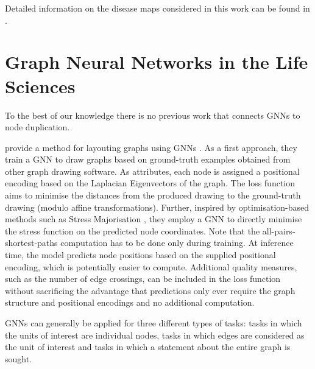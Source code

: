 \documentclass[
	fontsize=10pt, %
	twoside=false, %
	secnumdepth=1, %
  toc=indentunnumbered %
]{kaobook}
\begin{document}
Detailed information on the disease maps considered in this work can be found in
.



\section{Graph Neural Networks in the Life Sciences}
\label{sec:gnn-applications}




To the best of our knowledge there is no previous work that connects GNNs to
node duplication.

\citeauthor{tiezzi_GraphNeuralNetworks_2021} provide a method for layouting
graphs using GNNs
\cite{tiezzi_GraphNeuralNetworks_2021}
. As a first approach, they train a GNN to draw graphs based on
ground-truth examples obtained from other graph drawing software. As attributes,
each node is assigned a positional encoding based on the Laplacian Eigenvectors
of the graph. The loss function aims to minimise the distances from the produced
drawing to the ground-truth drawing (modulo affine transformations).
Further, inspired by optimisation-based methods such as Stress Majorisation
\cite{gansner_GraphDrawingStress_2005}, they employ a GNN to directly minimise
the stress function on the predicted node coordinates. Note that the
all-pairs-shortest-paths computation has to be done only during training. At
inference time, the model predicts node positions based on the supplied
positional encoding, which is potentially easier to compute. Additional quality
measures, such as the number of edge crossings, can be included in the loss
function without sacrificing the advantage that predictions only ever require
the graph structure and positional encodings and no additional computation.


GNNs can generally be applied for three different types of tasks:
 tasks in which the units of interest are individual nodes,
 tasks in which edges are considered as the unit of interest and
 tasks in which a statement about the entire graph is sought.
\end{document}
